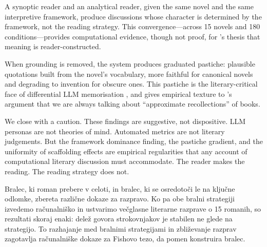 \documentclass{article}
\begin{document}
A synoptic reader and an analytical reader, given the same novel and
the same interpretive framework, produce discussions whose character is
determined by the framework, not the reading strategy.  This
convergence---across 15 novels and 180 conditions---provides
computational evidence, though not proof, for
\textcite{fish1980text}'s thesis that meaning is reader-constructed.

When grounding is removed, the system produces graduated pastiche:
plausible quotations built from the novel's vocabulary, more faithful
for canonical novels and degrading to invention for obscure ones.  This
pastiche is the literary-critical face of differential LLM memorisation
\parencite{carlini2021extracting}, and gives empirical texture to
\textcite{bayard2007comment}'s argument that we are always talking
about ``approximate recollections'' of books.

We close with a caution.  These findings are suggestive, not
dispositive.  LLM personas are not theories of mind.  Automated
metrics are not literary judgements.  But the framework dominance finding, the
pastiche gradient, and the uniformity of scaffolding effects are
empirical regularities that any account of computational literary
discussion must accommodate.  The reader makes the reading.  The
reading strategy does not.



\printbibliography

\newpage


\newpage
{}
\begin{abstracteng}
Bralec, ki roman prebere v celoti, in bralec, ki se osredoto\v{c}i le na klju\v{c}ne odlomke, zbereta razli\v{c}ne dokaze za razpravo.  Ko pa obe bralni strategiji izvedemo ra\v{c}unalni\v{s}ko in ustvarimo ve\v{c}glasne literarne razprave o 15 romanih, so rezultati skoraj enaki: dele\v{z} govora strokovnjakov je stabilen ne glede na strategijo.  To razhajanje med bralnimi strategijami in zbli\v{z}evanje razprav zagotavlja ra\v{c}unalni\v{s}ke dokaze za Fishovo tezo, da pomen konstruira bralec.
\end{abstracteng}
\end{document}

